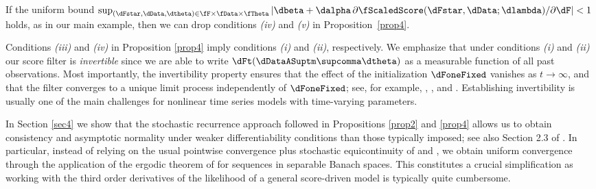 \begin{rem} \rm
\label{rem4}
If the uniform bound
$\sup_{(\dFstar,\dData,\dtheta) \in \fF \times \fData \times \fTheta} 
    |\dbeta + \dalpha\, \partial \fScaledScore  (\dFstar, \dData; \dlambda  ) / \partial \dF |  < 1
$ holds, as in our main example, then 
we can drop conditions \textit{(iv)} and \textit{(v)} in Proposition~\ref{prop4}. 
\end{rem}

\noindent Conditions \textit{(iii)} and \textit{(iv)} in Proposition \ref{prop4} imply conditions \textit{(i)} and \textit{(ii)}, respectively. 
We emphasize that under conditions \textit{(i)} and \textit{(ii)} our score filter is \textit{invertible} since we are able to write $\dFt(\dDataASuptm\supcomma\dtheta)$ as a measurable function of all past observations.
Most importantly, the invertibility property ensures that the effect of the initialization $\dFoneFixed$ vanishes as $t \to \infty$, and that  the filter converges to a unique limit process independently of $\dFoneFixed$; see, for example, \cite{Granger197887}, \cite{smikosch2006}, \cite{RePEc:pra:mprapa:46027} and \cite{BGKW2016}.
Establishing invertibility is usually one of the main challenges for nonlinear time series models with time-varying parameters. 

In Section \ref{sec4} we show that the stochastic recurrence approach followed
in Propositions \ref{prop2} and \ref{prop4} allows us to obtain consistency and
asymptotic normality under weaker differentiability conditions than those typically imposed;
see also Section 2.3 of \cite{smikosch2006}.
In particular, instead of relying on the usual pointwise convergence plus
stochastic equicontinuity of \citet{RePEc:cwl:cwldpp:940} and \citet{potscherprucha1994},
we obtain uniform convergence through the application of the ergodic theorem of \citet{rao1962}
for sequences in separable Banach spaces. This constitutes a crucial simplification as working with the third order derivatives of the likelihood of a general score-driven model is typically quite cumbersome. 





